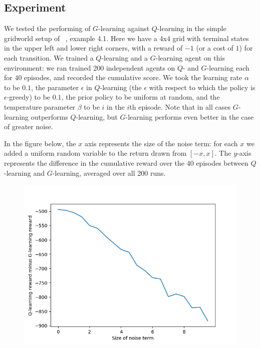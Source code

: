 \documentclass{article}
\begin{document}
\subsection{Experiment}

We tested the performing of $G$-learning against $Q$-learning in the simple gridworld setup of ~\cite{suttonAndBarto}, example 4.1. Here we have a 4x4 grid with terminal states in the upper left and lower right corners, with a reward of $-1$ (or a cost of $1$) for each transition. We trained a $Q$-learning and a $G$-learning agent on this environment: we ran trained 200 independent agents on $Q$- and $G$-learning each for 40 episodes, and recorded the cumulative score. We took the learning rate $\alpha$ to be $0.1$, the parameter $\epsilon$ in $Q$-learning (the $\epsilon$ with respect to which the policy is $\epsilon$-greedy) to be $0.1$, the prior policy to be uniform at random, and the temperature parameter $\beta$ to be $i$ in the $i$th episode. Note that in all cases $G$-learning outperforms $Q$-learning, but $G$-learning performs even better in the case of greater noise.

In the figure below, the $x$ axis represents the size of the noise term: for each $x$ we added a uniform random variable to the return drawn from $[-x,x]$. The $y$-axis represents the difference in the cumulative reward over the 40 episodes between $Q$-learning and $G$-learning, averaged over all 200 runs.

\begin{figure}[H]
\centering
\includegraphics[scale=0.7]{noisevsreward.png}
\end{figure}
\end{document}
